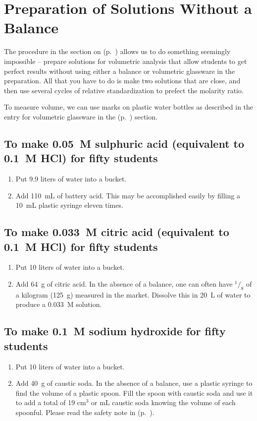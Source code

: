 \chapter{Preparation of Solutions Without a Balance} 
\label{cha:prep-solns-wo-bal}

The procedure in the section on  (p.~\pageref{cha:rel-stan}) allows us to do something seemingly impossible – prepare solutions for volumetric analysis that allow students to get perfect results without using either a balance or volumetric glassware in the preparation. All that you have to do is make two solutions that are close, and then use several cycles of relative standardization to prefect the molarity ratio. 

To measure volume, we can use marks on plastic water bottles as described in the entry for volumetric glassware in the  (p.~\pageref{cha:labequip}) section.

\section{To make 0.05~M sulphuric acid (equivalent to 0.1~M HCl) for fifty students} 
\begin{enumerate}
\item{Put 9.9 liters of water into a bucket.}
\item{Add 110~mL of battery acid. This may be accomplished easily by filling a 10~mL plastic syringe eleven times.}
\end{enumerate}

\section{To make 0.033~M citric acid (equivalent to 0.1~M HCl) for fifty students} 
\begin{enumerate}
\item{Put 10 liters of water into a bucket.}
\item{Add 64~g of citric acid. In the absence of a balance, one can often have $^1/_8$ of a kilogram (125~g) measured in the market. Dissolve this in 20~L of water to produce a 0.033~M solution.}
\end{enumerate}

\section{To make 0.1~M sodium hydroxide for fifty students} 
\begin{enumerate}
\item{Put 10 liters of water into a bucket.}
\item{Add 40~g of caustic soda. In the absence of a balance, use a plastic syringe to find the volume of a plastic spoon. Fill the spoon with caustic soda and use it to add a total of 19 $\mathrm{cm}^3$ or $\mathrm{mL}$ caustic soda knowing the volume of each spoonful. Please read the safety note in  (p.~\pageref{cha:dangerchem}).}
\end{enumerate}

